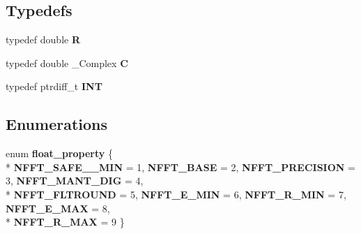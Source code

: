\subsection*{Typedefs}
\begin{DoxyCompactItemize}
\item 
\hypertarget{group__nfftutil_ga7a378e1d420f329b25004d78cbcc508e}{typedef double {\bfseries R}}\label{group__nfftutil_ga7a378e1d420f329b25004d78cbcc508e}

\item 
\hypertarget{group__nfftutil_gae3672099132a831c594aee424c75aa26}{typedef double \-\_\-\-Complex {\bfseries C}}\label{group__nfftutil_gae3672099132a831c594aee424c75aa26}

\item 
\hypertarget{group__nfftutil_ga1d10e3f4e0bf45a3d262f566afb235a3}{typedef ptrdiff\-\_\-t {\bfseries I\-N\-T}}\label{group__nfftutil_ga1d10e3f4e0bf45a3d262f566afb235a3}

\end{DoxyCompactItemize}
\subsection*{Enumerations}
\begin{DoxyCompactItemize}
\item 
enum {\bfseries float\-\_\-property} \{ \\*
{\bfseries N\-F\-F\-T\-\_\-\-S\-A\-F\-E\-\_\-\-\_\-\-M\-I\-N} = 1, 
{\bfseries N\-F\-F\-T\-\_\-\-B\-A\-S\-E} = 2, 
{\bfseries N\-F\-F\-T\-\_\-\-P\-R\-E\-C\-I\-S\-I\-O\-N} = 3, 
{\bfseries N\-F\-F\-T\-\_\-\-M\-A\-N\-T\-\_\-\-D\-I\-G} = 4, 
\\*
{\bfseries N\-F\-F\-T\-\_\-\-F\-L\-T\-R\-O\-U\-N\-D} = 5, 
{\bfseries N\-F\-F\-T\-\_\-\-E\-\_\-\-M\-I\-N} = 6, 
{\bfseries N\-F\-F\-T\-\_\-\-R\-\_\-\-M\-I\-N} = 7, 
{\bfseries N\-F\-F\-T\-\_\-\-E\-\_\-\-M\-A\-X} = 8, 
\\*
{\bfseries N\-F\-F\-T\-\_\-\-R\-\_\-\-M\-A\-X} = 9
 \}
\end{DoxyCompactItemize}
